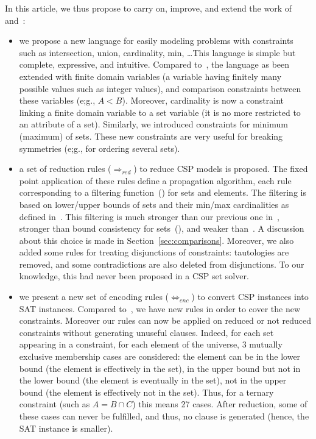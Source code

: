\documentclass[3p,authoryear,times]{elsarticle}
\newcommand{\rmin}[0]{{\Rightarrow_{red}}}
\newcommand{\enc}[0]{\Leftrightarrow_{enc}}
\begin{document}
In this article, we thus propose to carry on, improve, and extend the work of~\cite{aor} and~\cite{aisc2014}:
\begin{itemize}

\item we propose a new language for easily modeling problems with constraints such as intersection, union, cardinality, min, \ldots  This language is simple but complete, expressive, and intuitive. Compared to~\cite{aor,aisc2014}, the language as been extended with finite domain variables (a variable having finitely many possible values such as integer values), and comparison constraints between these variables (e;g., $A < B$). Moreover, cardinality is now a constraint linking a finite domain variable to a set variable (it is no more restricted to an attribute of a set). Similarly, we introduced constraints for minimum (maximum) of sets. These new constraints are very useful for breaking symmetries (e;g., for ordering several sets).
 
\item a set of reduction rules ($\rmin$) to reduce CSP models is proposed. The fixed point application of these rules define a propagation algorithm, each rule corresponding to a filtering function~(\cite{apt_ci}) for sets and elements. The filtering is based on lower/upper bounds of sets and their min/max cardinalities as defined in~\cite{azevedoThesis}. This filtering is much stronger than our previous one in~\cite{aisc2014}, stronger than bound consistency for sets~(\cite{ConjuntoILPS94}), and weaker than~\cite{yip11}. A discussion about this choice is made in Section~\ref{sec:comparisons}. Moreover, we also added some rules for treating disjunctions of constraints: tautologies are removed, and some contradictions are also deleted from disjunctions. To our knowledge, this had never been proposed in a CSP set solver.



\item we present a new set of encoding rules ($\enc$) to convert CSP instances into SAT instances. Compared to~\cite{aisc2014}, we have new rules in order to cover the new constraints. Moreover our rules can now be applied on reduced or not reduced constraints without generating unuseful clauses. Indeed, for each set appearing in a constraint, for each element of the universe, 3 mutually exclusive membership cases are considered: the element can be in the lower bound (the element is effectively in the set), in the upper bound but not in the lower bound (the element is eventually in the set), not in the upper bound (the element is effectively not in the set). Thus, for a ternary constraint (such as $A=B \cap C$) this means 27 cases. After reduction, some of these cases can never be fulfilled, and thus, no clause is generated (hence, the SAT instance is smaller).
\end{itemize}
\end{document}
